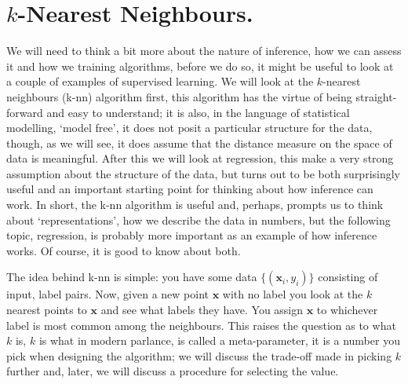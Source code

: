 \documentclass[12pt]{article}
\begin{document}
\section*{$k$-Nearest Neighbours.} 

We will need to think a bit more about the nature of inference, how we
can assess it and how we training algorithms, before we do so, it
might be useful to look at a couple of examples of supervised
learning. We will look at the $k$-nearest neighbours (k-nn) algorithm
first, this algorithm has the virtue of being straight-forward and
easy to understand; it is also, in the language of statistical
modelling, `model free', it does not posit a particular structure for
the data, though, as we will see, it does assume that the distance
measure on the space of data is meaningful. After this we will look at
regression, this make a very strong assumption about the structure of
the data, but turns out to be both surprisingly useful and an
important starting point for thinking about how inference can work. In
short, the k-nn algorithm is useful and, perhaps, prompts us to think
about `representations', how we describe the data in numbers, but the
following topic, regression, is probably more important as an example
of how inference works. Of course, it is good to know about both.

The idea behind k-nn is simple: you have some data
$\{(\textbf{x}_i,y_i)\}$ consisting of input, label pairs. Now, given
a new point $\textbf{x}$ with no label you look at the $k$ nearest
points to $\textbf{x}$ and see what labels they have. You assign
$\textbf{x}$ to whichever label is most common among the
neighbours. This raises the question as to what $k$ is, $k$ is what in
modern parlance, is called a meta-parameter, it is a number you pick
when designing the algorithm; we will discuss the trade-off made in
picking $k$ further and, later, we will discuss a procedure for
selecting the value.
\end{document}

